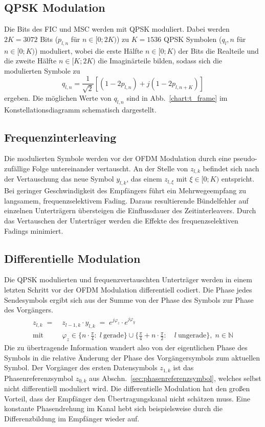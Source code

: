 \subsection{QPSK Modulation}
\label{sec:qpsk}
Die Bits des FIC und MSC werden mit QPSK moduliert. Dabei werden $2K=3072$ Bits ($p_{l,n}$ für $n\in[0;2K)$) zu $K=1536$ QPSK Symbolen ($q_l,n$ für $n\in[0;K)$) moduliert, wobei die erste Hälfte $n\in [0;K)$ der Bits die Realteile und die zweite Hälfte $n\in [K;2K)$ die Imaginärteile bilden, sodass sich die modulierten Symbole zu
\begin{equation}
q_{l,n} = \frac{1}{\sqrt{2}}\left[\left(1-2p_{l,n}\right)+j\left(1-2p_{l,n+K}\right)\right]
\end{equation}
ergeben. Die möglichen Werte von $q_{l,n}$ sind in Abb.~\ref{chart:t_frame} im Konstellationsdiagramm schematisch dargestellt.

\subsection{Frequenzinterleaving}
Die modulierten Symbole werden vor der OFDM Modulation durch eine pseudo-zufällige Folge untereinander vertauscht. An der Stelle von $z_{l,k}$ befindet sich nach der Vertauschung das neue Symbol $y_{l,k}$, das einem $z_{l,\xi}$ mit $\xi \in [0;K)$ entspricht. Bei geringer Geschwindigkeit des Empfängers führt ein Mehrwegeempfang zu langsamem, frequenzselektivem Fading. Daraus resultierende Bündelfehler auf einzelnen Unterträgern übersteigen die Einflussdauer des Zeitinterleavers. Durch das Vertauschen der Unterträger werden die Effekte des frequenzselektiven Fadings minimiert.


\subsection{Differentielle Modulation}
\label{sec:diff_mod}
Die QPSK modulierten und frequenzvertauschten Unterträger werden in einem letzten Schritt vor der OFDM Modulation differentiell codiert. Die Phase jedes Sendesymbols ergibt sich aus der Summe von der Phase des Symbols zur Phase des Vorgängers.
\begin{equation}
\begin{aligned}
z_{l,k}\; =\; &z_{l-1,k}\cdot y_{l,k}\; =\; e^{j\varphi_z} \cdot e^{j\varphi_y} \\
\text{mit} \; \; &\varphi_z \in \{n \cdot \frac{\pi}{4}: \; l \: \text{gerade}\} \cup \{\frac{\pi}{4} + n \cdot \frac{\pi}{2}: \quad l \: \text{ungerade}\}, \; n\in \mathbb{N} 
\end{aligned}
\end{equation}
Die zu übertragende Information wandert also von der eigentlichen Phase des Symbols in die relative Änderung der Phase des Vorgängersymbols zum aktuellen Symbol. Der Vorgänger des ersten Datensymbols $z_{1,k}$ ist das Phasenreferenzsymbol $z_{0,k}$ aus Abschn.~\ref{sec:phasenreferenzsymbol}, welches selbst nicht differentiell moduliert wird. Die differentielle Modulation hat den großen Vorteil, dass der Empfänger den Übertragungskanal nicht schätzen muss. Eine konstante Phasendrehung im Kanal hebt sich beispielsweise durch die Differenzbildung im Empfänger wieder auf.

